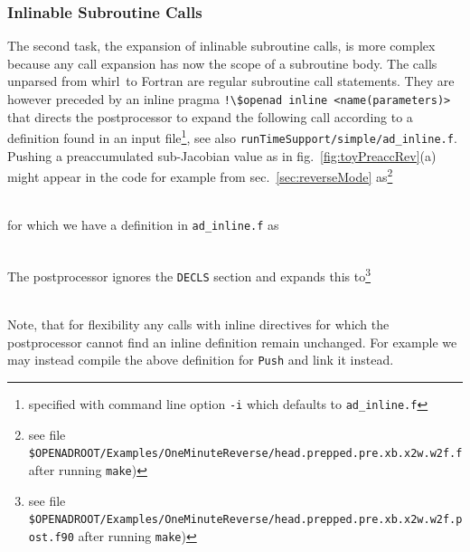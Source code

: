 \documentclass{book}
\newcommand{\whirl}{whirl}
\newcommand{\refsec}[1]{{sec.~\ref{#1}}}
\newcommand{\reffig}[1]{{fig.~\ref{#1}}}
\begin{document}
\subsubsection{Inlinable Subroutine Calls}\label{sec:inline}
The second task, the expansion of inlinable subroutine calls, is more complex because 
any call expansion has now the scope of a subroutine body. The calls unparsed from \whirl\ to 
Fortran are regular subroutine call statements. They are however preceded by an inline  pragma
\lstinline{!\$openad inline <name(parameters)>}  
that directs the postprocessor to expand the following call according to a definition 
found in an input file\footnote{
specified with command line option \lstinline{-i} which defaults to \lstinline{ad_inline.f}
}, see also \lstinline{runTimeSupport/simple/ad_inline.f}.
Pushing a preaccumulated sub-Jacobian value as in  \reffig{fig:toyPreaccRev}(a) might appear 
in the code for example from \refsec{sec:reverseMode} as\footnote{
see file \lstinline{$OPENADROOT/Examples/OneMinuteReverse/head.prepped.pre.xb.x2w.w2f.f} after running \lstinline{make}) %
} \\[1ex]
\hspace*{.05\textwidth}\begin{minipage}{.6\textwidth}
\small

\end{minipage}\\
for which we have a definition in \lstinline{ad_inline.f} as \\[1ex]
\hspace*{.05\textwidth}\begin{minipage}{.6\textwidth}
\small

\end{minipage}\\
The postprocessor ignores the \lstinline{DECLS} section and  expands this to\footnote{
see file \lstinline{$OPENADROOT/Examples/OneMinuteReverse/head.prepped.pre.xb.x2w.w2f.post.f90} after running \lstinline{make}) %
}\\[1ex]
\hspace*{.05\textwidth}\begin{minipage}{.6\textwidth}
\small

\end{minipage}\\
Note, that for flexibility 
any calls with inline directives for which the postprocessor cannot find an inline definition remain 
unchanged. For example we may instead compile the above definition for \lstinline{Push} and link 
it instead.
\end{document}
